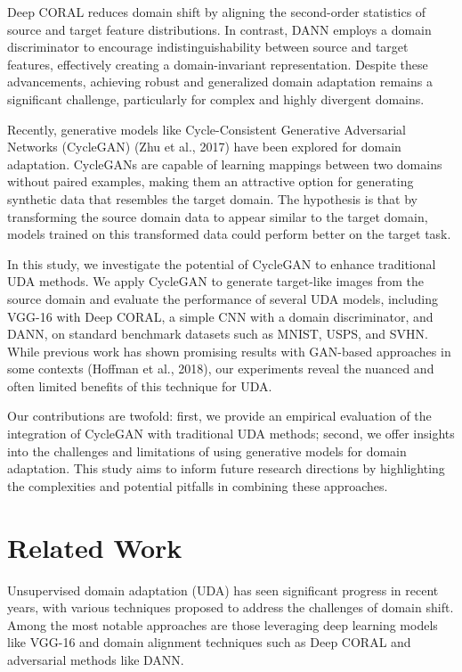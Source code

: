\documentclass[conference]{IEEEtran}
\begin{document}
Deep CORAL reduces domain shift by aligning the second-order statistics of source and target feature distributions. In contrast, DANN employs a domain discriminator to encourage indistinguishability between source and target features, effectively creating a domain-invariant representation. Despite these advancements, achieving robust and generalized domain adaptation remains a significant challenge, particularly for complex and highly divergent domains.

Recently, generative models like Cycle-Consistent Generative Adversarial Networks (CycleGAN) (Zhu et al., 2017) have been explored for domain adaptation. CycleGANs are capable of learning mappings between two domains without paired examples, making them an attractive option for generating synthetic data that resembles the target domain. The hypothesis is that by transforming the source domain data to appear similar to the target domain, models trained on this transformed data could perform better on the target task.

In this study, we investigate the potential of CycleGAN to enhance traditional UDA methods. We apply CycleGAN to generate target-like images from the source domain and evaluate the performance of several UDA models, including VGG-16 with Deep CORAL, a simple CNN with a domain discriminator, and DANN, on standard benchmark datasets such as MNIST, USPS, and SVHN. While previous work has shown promising results with GAN-based approaches in some contexts (Hoffman et al., 2018), our experiments reveal the nuanced and often limited benefits of this technique for UDA.

Our contributions are twofold: first, we provide an empirical evaluation of the integration of CycleGAN with traditional UDA methods; second, we offer insights into the challenges and limitations of using generative models for domain adaptation. This study aims to inform future research directions by highlighting the complexities and potential pitfalls in combining these approaches.

\section{Related Work}
Unsupervised domain adaptation (UDA) has seen significant progress in recent years, with various techniques proposed to address the challenges of domain shift. Among the most notable approaches are those leveraging deep learning models like VGG-16 and domain alignment techniques such as Deep CORAL and adversarial methods like DANN.
\end{document}
